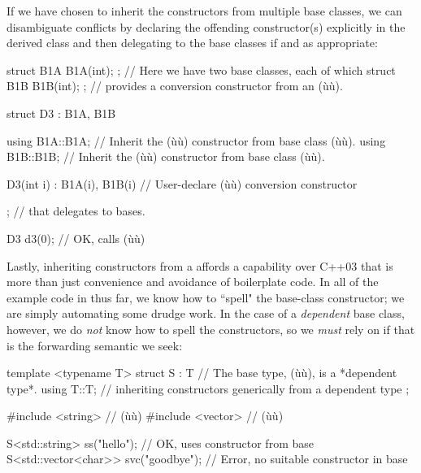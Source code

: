 If we have chosen to inherit the constructors from multiple
base classes, we can disambiguate conflicts by declaring the offending
constructor(s) explicitly in the derived class and then delegating to
the base classes if and as appropriate:

\begin{emcppslisting}
struct B1A { B1A(int); };  // Here we have two base classes, each of which
struct B1B { B1B(int); };  // provides a conversion constructor from an (ù{}ù).

struct D3 : B1A, B1B
{
    using B1A::B1A;  // Inherit the (ù{}ù) constructor from base class (ù{}ù).
    using B1B::B1B;  // Inherit the (ù{}ù) constructor from base class (ù{}ù).

    D3(int i) : B1A(i), B1B(i) { }  // User-declare (ù{}ù) conversion constructor
};                                  // that delegates to bases.

D3 d3(0);  // OK, calls (ù{}ù)
\end{emcppslisting}

\noindent Lastly, inheriting constructors from a  affords a capability over C++03 that is more than just convenience
and avoidance of boilerplate code.
  In all of the example code in 
  thus far, we know how to ``spell" the
base-class constructor; we are simply automating some drudge work. In
the case of a \emph{dependent} base class, however, we do \emph{not}
know how to spell the constructors, so we \emph{must} rely on
 if that is the forwarding semantic we
seek:

\begin{emcppslisting}
template <typename T>
struct S : T  // The base type, (ù{}ù), is a *dependent type*.
{
    using T::T;  // inheriting constructors generically from a dependent type
};

#include <string>   // (ù{}ù)
#include <vector>   // (ù{}ù)

S<std::string>        ss("hello");    // OK, uses constructor from base
S<std::vector<char>> svc("goodbye");  // Error, no suitable constructor in base
\end{emcppslisting}

